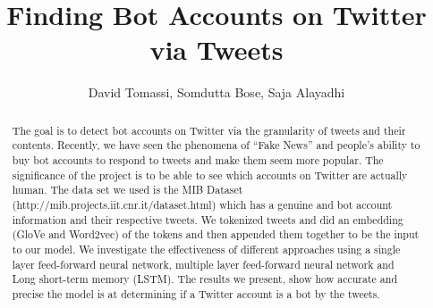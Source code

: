 \documentclass[a4paper,12pt]{article}
\title{Finding Bot Accounts on Twitter via Tweets}
\author{David Tomassi, Somdutta Bose, Saja Alayadhi}
\begin{document}
\maketitle

\begin{abstract}
The goal is to detect bot accounts on Twitter via the granularity of tweets and their contents. Recently, we have seen the phenomena of ``Fake News'' and people's ability to buy bot accounts to respond to tweets and make them seem more popular. The significance of the project is to be able to see which accounts on Twitter are actually human. The data set we used is the MIB Dataset (http://mib.projects.iit.cnr.it/dataset.html) which has a genuine and bot account information and their respective tweets. We tokenized tweets and did an embedding (GloVe and Word2vec) of the tokens and then appended them together to be the input to our model. We investigate the effectiveness of different approaches using a single layer feed-forward neural network, multiple layer feed-forward neural network and Long short-term memory (LSTM). The results we present, show how accurate and precise the model is at determining if a Twitter account is a bot by the tweets.
\end{abstract}













%






\end{document}
